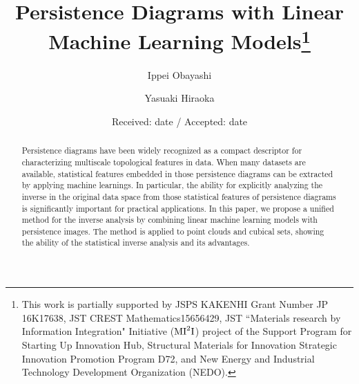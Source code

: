 \documentclass[smallextended]{svjour3}
\begin{document}
\title{Persistence Diagrams with Linear Machine Learning Models\thanks{
    This work is partially supported by 
    JSPS KAKENHI Grant Number JP 16K17638, 
    JST CREST Mathematics15656429, 
    JST ``Materials research by Information Integration" Initiative (${\rm MI}^2{\rm I}$) project of the Support Program for Starting Up Innovation Hub, 
    Structural Materials for Innovation Strategic Innovation Promotion Program D72, and New Energy and Industrial Technology Development Organization (NEDO).
  }}


\author{Ippei Obayashi \and Yasuaki Hiraoka}


\date{Received: date / Accepted: date}

\maketitle

\begin{abstract}
Persistence diagrams have been widely recognized as a compact descriptor for characterizing multiscale topological features in data. When many datasets are available, statistical features embedded in those persistence diagrams can be extracted by applying machine learnings. In particular, the ability for explicitly analyzing the inverse in the original data space from those statistical features of persistence diagrams is significantly important for practical applications. In this paper, we propose a unified method for the inverse analysis by combining linear machine learning models with persistence images. The method is applied to point clouds and cubical sets, showing the ability of the statistical inverse analysis and its advantages. 

\end{abstract}
\end{document}
